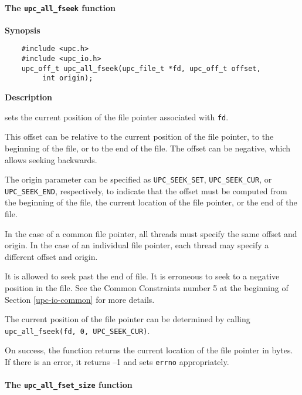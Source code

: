 \paragraph{The {\tt upc\_all\_fseek} function}

{\bf Synopsis}

\npf\vspace{-2.5em} 

\begin{verbatim}
    #include <upc.h>
    #include <upc_io.h> 
    upc_off_t upc_all_fseek(upc_file_t *fd, upc_off_t offset, 
         int origin);
\end{verbatim}

{\bf Description}

 sets the current position of the file pointer associated
with {\tt fd}.

\np This offset can be relative to the current position of the file pointer,
to the beginning of the file, or to the end of the file. The offset can be
negative, which allows seeking backwards.

\np The origin parameter can be specified as {\tt UPC\_SEEK\_SET}, {\tt UPC\_SEEK\_CUR},
or {\tt UPC\_SEEK\_END}, respectively, to indicate that the offset must be
computed from the beginning of the file, the current location of the file
pointer, or the end of the file.

\np In the case of a common file pointer, all threads must specify the same
offset and origin. In the case of an individual file pointer, each thread may
specify a different offset and origin.

\np It is allowed to seek past the end of file. It is erroneous to seek to a
negative position in the file. See the Common Constraints number 5 at the
beginning of Section \ref{upc-io-common} for more details.

\np The current position of the file pointer can be determined by calling
{\tt upc\_all\_fseek(fd, 0, UPC\_SEEK\_CUR)}.

\np On success, the function returns the current location of the file pointer
in bytes. If there is an error, it returns --1 and sets {\tt errno} appropriately.

\paragraph{The {\tt upc\_all\_fset\_size} function}

